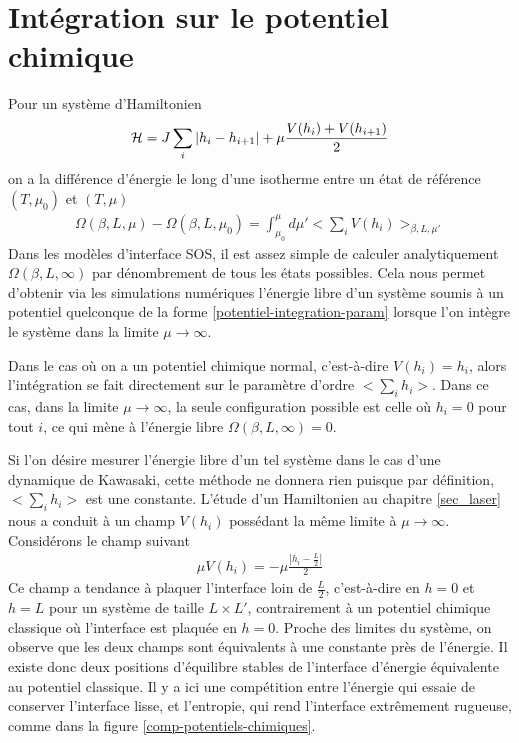 \section{Intégration sur le potentiel chimique}

Pour un système d'Hamiltonien 
\begin{align}
    \mathcal{H} = J \sum_i |h_i-h_{i+1}| + \mu \frac{V(h_i)+V(h_{i+1})}{2}
    \label{potentiel-integration-param}
\end{align}
on a la différence d'énergie le long d'une isotherme entre un état de référence $(T,\mu_0)$ et $(T,\mu)$ \cite{lopes_cardozo_critical_2014}
\begin{align}
   \Omega(\beta,L,\mu) - \Omega(\beta,L,\mu_0) = \int_{\mu_0}^\mu d\mu'  < \sum_i V(h_i) >_{\beta,L,\mu'} 
\end{align}
Dans les modèles d'interface SOS, il est assez simple de calculer analytiquement $\Omega(\beta,L,\infty)$ par dénombrement de tous les états possibles. Cela nous permet d'obtenir via les simulations numériques l'énergie libre d'un système soumis à un potentiel quelconque de la forme \ref{potentiel-integration-param} lorsque l'on intègre le système dans la limite $\mu \to \infty$.

Dans le cas où on a un potentiel chimique normal, c'est-à-dire $V(h_i)= h_i$, alors l'intégration se fait directement sur le paramètre d'ordre $<\sum_i h_i>$. Dans ce cas, dans la limite $\mu \to \infty$, la seule configuration possible est celle où $h_i=0$ pour tout $i$, ce qui mène à l'énergie libre $\Omega(\beta,L,\infty) = 0$. 

Si l'on désire mesurer l'énergie libre d'un tel système dans le cas d'une dynamique de Kawasaki, cette méthode ne donnera rien puisque par définition, $<\sum_i h_i>$ est une constante. L'étude d'un Hamiltonien au chapitre \ref{sec_laser} nous a conduit à un champ $V(h_i)$ possédant la même limite à $\mu \to \infty$. Considérons le champ suivant
\begin{align}
    \mu V(h_i) = -\mu \frac{|h_i-\frac{L}{2}|}{2}
    \label{neggstaged}
\end{align}
Ce champ a tendance à plaquer l'interface loin de $\frac{L}{2}$, c'est-à-dire en $h=0$ et $h=L$ pour un système de taille $L\times L'$, contrairement à un potentiel chimique classique où l'interface est plaquée en $h=0$. Proche des limites du système, on observe que les deux champs sont équivalents à une constante près de l'énergie. Il existe donc deux positions d'équilibre stables de l'interface d'énergie équivalente au potentiel classique. Il y a ici une compétition entre l'énergie qui essaie de conserver l'interface lisse, et l'entropie, qui rend l'interface extrêmement rugueuse, comme dans la figure \ref{comp-potentiels-chimiques}.

